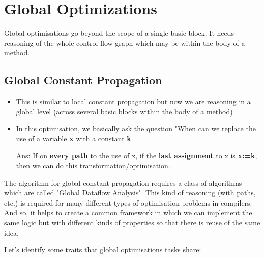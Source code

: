 \section{Global Optimizations}

Global optimisations go beyond the scope of a single basic block. It needs reasoning of the whole control flow graph which may be within the body of a method.


\subsection{Global Constant Propagation}

\begin{itemize}
    \item This is similar to local constant propagation but now we are reasoning in a global level (across several basic blocks within the body of a method)
    \item In this optimisation, we basically ask the question "When can we replace the use of a variable \textbf{x} with a constant \textbf{k}
    
    Ans: If on \textbf{every path} to the use of x, if the \textbf{last assignment} to x is \textbf{x:=k}, then we can do this transformation/optimisation.
\end{itemize}


The algorithm for global constant propagation requires a class of algorithms which are called "Global Dataflow Analysis". This kind of reasoning (with paths, etc.) is required for many different types of optimisation problems in compilers. And so, it helps to create a common framework in which we can implement the same logic but with different kinds of properties so that there is reuse of the same idea.

Let's identify some traits that global optimisations tasks share:

